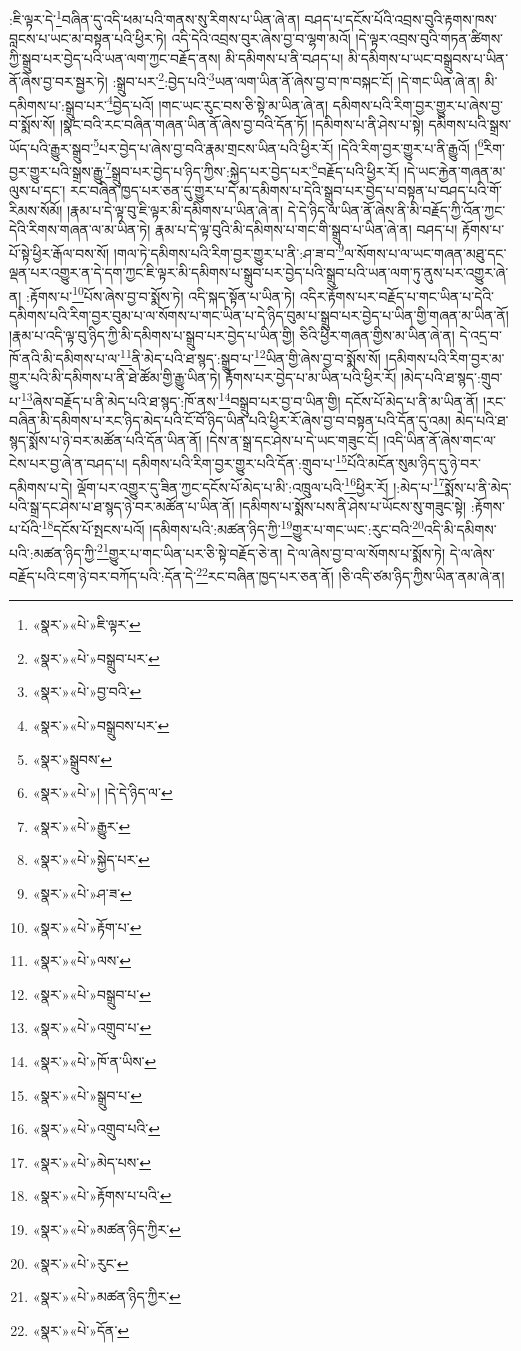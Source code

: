 :ཇི་ལྟར་དེ་\footnote{«སྣར་»«པེ་»ཇི་ལྟར་}བཞིན་དུ་འདི་ཕམ་པའི་གནས་སུ་རིགས་པ་ཡིན་ཞེ་ན། བཤད་པ་དངོས་པོའི་འབྲས་བུའི་རྟགས་ཁས་བླངས་པ་ཡང་མ་བསྟན་པའི་ཕྱིར་ཏེ། འདི་དེའི་འབྲས་བུར་ཞེས་བྱ་བ་ལྷག་མའོ། །དེ་ལྟར་འབྲས་བུའི་གཏན་ཚིགས་ཀྱི་སྒྲུབ་པར་བྱེད་པའི་ཡན་ལག་ཀྱང་བརྗོད་ནས། མི་དམིགས་པ་ནི་བཤད་པ། མི་དམིགས་པ་ཡང་བསྒྲུབས་པ་ཡིན་ནོ་ཞེས་བྱ་བར་སྦྱར་ཏེ། :སྒྲུབ་པར་\footnote{«སྣར་»«པེ་»བསྒྲུབ་པར་}:བྱེད་པའི་\footnote{«སྣར་»«པེ་»བྱ་བའི་}ཡན་ལག་ཡིན་ནོ་ཞེས་བྱ་བ་ཁ་བསྐང་ངོ། །དེ་གང་ཡིན་ཞེ་ན། མི་དམིགས་པ་:སྒྲུབ་པར་\footnote{«སྣར་»«པེ་»བསྒྲུབས་པར་}བྱེད་པའོ། །གང་ཡང་རུང་བས་ཅི་སྟེ་མ་ཡིན་ཞེ་ན། དམིགས་པའི་རིག་བྱར་གྱུར་པ་ཞེས་བྱ་བ་སྨོས་སོ། །སྣང་བའི་རང་བཞིན་གཞན་ཡིན་ནོ་ཞེས་བྱ་བའི་དོན་ཏོ། །དམིགས་པ་ནི་ཤེས་པ་སྟེ། དམིགས་པའི་སྒྲས་ཡོད་པའི་རྒྱུར་སྒྲུབ་\footnote{«སྣར་»སྒྲུབས་}པར་བྱེད་པ་ཞེས་བྱ་བའི་རྣམ་གྲངས་ཡིན་པའི་ཕྱིར་རོ། །དེའི་རིག་བྱར་གྱུར་པ་ནི་རྒྱུའོ། །\footnote{«སྣར་»«པེ་»། །དེ་དེ་ཉིད་ལ་}རིག་བྱར་གྱུར་པའི་སྒྲས་རྒྱུ་\footnote{«སྣར་»«པེ་»རྒྱུར་}སྒྲུབ་པར་བྱེད་པ་ཉིད་ཀྱིས་:སྐྱེད་པར་བྱེད་པར་\footnote{«སྣར་»«པེ་»སྐྱེད་པར་}བརྗོད་པའི་ཕྱིར་རོ། །དེ་ཡང་རྐྱེན་གཞན་མ་ལུས་པ་དང་། རང་བཞིན་ཁྱད་པར་ཅན་དུ་གྱུར་པ་དེ་མ་དམིགས་པ་དེའི་སྒྲུབ་པར་བྱེད་པ་བསྟན་པ་བཤད་པའི་གོ་རིམས་སོམོ། །རྣམ་པ་དེ་ལྟ་བུ་ཇི་ལྟར་མི་དམིགས་པ་ཡིན་ཞེ་ན། དེ་དེ་ཉིད་ལ་ཡིན་ནོ་ཞེས་ནི་མི་བརྗོད་ཀྱི་འོན་ཀྱང་དེའི་རིགས་གཞན་ལ་མ་ཡིན་ཏེ། རྣམ་པ་དེ་ལྟ་བུའི་མི་དམིགས་པ་གང་གི་སྒྲུབ་པ་ཡིན་ཞེ་ན། བཤད་པ། རྟོགས་པ་པོ་སྟེ་ཕྱིར་རྒོལ་བས་སོ། །གལ་ཏེ་དམིགས་པའི་རིག་བྱར་གྱུར་པ་ནི་:ཤ་ཟ་བ་\footnote{«སྣར་»«པེ་»ཤ་ཟ་}ལ་སོགས་པ་ལ་ཡང་གཞན་མཐུ་དང་ལྡན་པར་འགྱུར་ན་དེ་དག་ཀྱང་ཇི་ལྟར་མི་དམིགས་པ་སྒྲུབ་པར་བྱེད་པའི་སྒྲུབ་པའི་ཡན་ལག་ཏུ་ནུས་པར་འགྱུར་ཞེ་ན། :རྟོགས་པ་\footnote{«སྣར་»«པེ་»རྟོག་པ་}པོས་ཞེས་བྱ་བ་སྨོས་ཏེ། འདི་སྐད་སྟོན་པ་ཡིན་ཏེ། འདིར་རྟོགས་པར་བརྗོད་པ་གང་ཡིན་པ་དེའི་དམིགས་པའི་རིག་བྱར་བུམ་པ་ལ་སོགས་པ་གང་ཡིན་པ་དེ་ཉིད་བུམ་པ་སྒྲུབ་པར་བྱེད་པ་ཡིན་གྱི་གཞན་མ་ཡིན་ནོ། །རྣམ་པ་འདི་ལྟ་བུ་ཉིད་ཀྱི་མི་དམིགས་པ་སྒྲུབ་པར་བྱེད་པ་ཡིན་གྱི། ཅིའི་ཕྱིར་གཞན་གྱིས་མ་ཡིན་ཞེ་ན། དེ་འདྲ་བ་ཁོ་ནའི་མི་དམིགས་པ་ལ་\footnote{«སྣར་»«པེ་»ལས་}ནི་མེད་པའི་ཐ་སྙད་:སྒྲུབ་པ་\footnote{«སྣར་»«པེ་»བསྒྲུབ་པ་}ཡིན་གྱི་ཞེས་བྱ་བ་སྨོས་སོ། །དམིགས་པའི་རིག་བྱར་མ་གྱུར་པའི་མི་དམིགས་པ་ནི་ཐེ་ཚོམ་གྱི་རྒྱུ་ཡིན་ཏེ། རྟོགས་པར་བྱེད་པ་མ་ཡིན་པའི་ཕྱིར་རོ། །མེད་པའི་ཐ་སྙད་:གྲུབ་པ་\footnote{«སྣར་»«པེ་»འགྲུབ་པ་}ཞེས་བརྗོད་པ་ནི་མེད་པའི་ཐ་སྙད་:ཁོ་ནས་\footnote{«སྣར་»«པེ་»ཁོ་ན་ཡིས་}བསྒྲུབ་པར་བྱ་བ་ཡིན་གྱི། དངོས་པོ་མེད་པ་ནི་མ་ཡིན་ནོ། །རང་བཞིན་མི་དམིགས་པ་རང་ཉིད་མེད་པའི་ངོ་བོ་ཉིད་ཡིན་པའི་ཕྱིར་རོ་ཞེས་བྱ་བ་བསྟན་པའི་དོན་དུ་འམ། མེད་པའི་ཐ་སྙད་སྨོས་པ་ཉེ་བར་མཚོན་པའི་དོན་ཡིན་ནོ། །དེས་ན་སྒྲ་དང་ཤེས་པ་དེ་ཡང་གཟུང་ངོ། །འདི་ཡིན་ནོ་ཞེས་གང་ལ་ངེས་པར་བྱ་ཞེ་ན་བཤད་པ། དམིགས་པའི་རིག་བྱར་གྱུར་པའི་དོན་:གྲུབ་པ་\footnote{«སྣར་»«པེ་»སྒྲུབ་པ་}པོའི་མངོན་སུམ་ཉིད་དུ་ཉེ་བར་དམིགས་པ་དེ། ལྡོག་པར་འགྱུར་དུ་ཟིན་ཀྱང་དངོས་པོ་མེད་པ་མི་:འཁྲུལ་པའི་\footnote{«སྣར་»«པེ་»འགྲུབ་པའི་}ཕྱིར་རོ། །:མེད་པ་\footnote{«སྣར་»«པེ་»མེད་པས་}སྨོས་པ་ནི་མེད་པའི་སྒྲ་དང་ཤེས་པ་ཐ་སྙད་ཉེ་བར་མཚོན་པ་ཡིན་ནོ། །དམིགས་པ་སྨོས་པས་ནི་ཤེས་པ་ཡོངས་སུ་གཟུང་སྟེ། :རྟོགས་པ་པོའི་\footnote{«སྣར་»«པེ་»རྟོགས་པ་པའི་}དངོས་པོ་སྤངས་པའོ། །དམིགས་པའི་:མཚན་ཉིད་ཀྱི་\footnote{«སྣར་»«པེ་»མཚན་ཉིད་ཀྱིར་}གྱུར་པ་གང་ཡང་:རུང་བའི་\footnote{«སྣར་»«པེ་»རུང་}འདི་མི་དམིགས་པའི་:མཚན་ཉིད་ཀྱི་\footnote{«སྣར་»«པེ་»མཚན་ཉིད་ཀྱིར་}གྱུར་པ་གང་ཡིན་པར་ཅི་སྟེ་བརྗོད་ཅེ་ན། དེ་ལ་ཞེས་བྱ་བ་ལ་སོགས་པ་སྨོས་ཏེ། དེ་ལ་ཞེས་བརྗོད་པའི་ངག་ཉེ་བར་བཀོད་པའི་:དོན་དེ་\footnote{«སྣར་»«པེ་»དོན་}རང་བཞིན་ཁྱད་པར་ཅན་ནོ། །ཅི་འདི་ཙམ་ཉིད་ཀྱིས་ཡིན་ནམ་ཞེ་ན། 